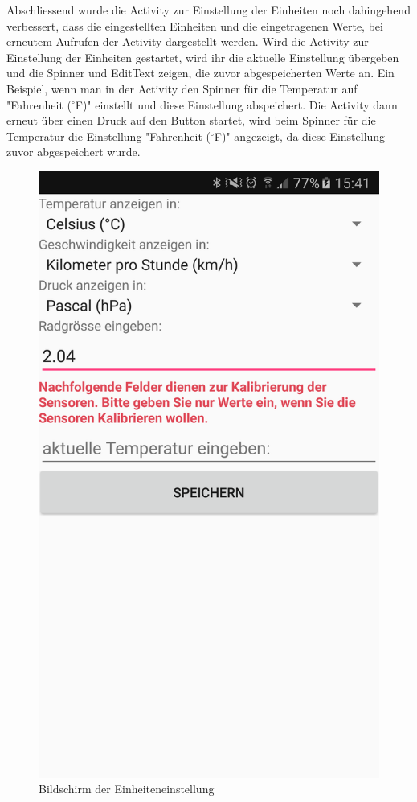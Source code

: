 Abschliessend wurde die Activity zur Einstellung der Einheiten noch dahingehend verbessert, dass die eingestellten Einheiten und die eingetragenen Werte, bei erneutem Aufrufen der Activity dargestellt werden. Wird die Activity zur Einstellung der Einheiten gestartet, wird ihr die aktuelle Einstellung übergeben und die Spinner und EditText zeigen, die zuvor abgespeicherten Werte an. Ein Beispiel, wenn man in der Activity den Spinner für die Temperatur auf "Fahrenheit ($^\circ$F)" einstellt und diese Einstellung abspeichert. Die Activity dann erneut über einen Druck auf den Button startet, wird beim Spinner für die Temperatur die Einstellung "Fahrenheit ($^\circ$F)" angezeigt, da diese Einstellung zuvor abgespeichert wurde.

\begin{figure}[ht]
    \includegraphics{3Vorgehen/imag/BLEEinheitenUndEinstellungenStart.png}
    \caption{Bildschirm der Einheiteneinstellung}
	\label{BLEEinheitenUndEinstellungenStart} 
\end{figure}

